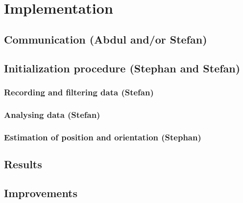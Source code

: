 \section{Implementation}\label{Sec_Imp}

\subsection{Communication (Abdul and/or Stefan)}

\subsection{Initialization procedure (Stephan and Stefan)}

\subsubsection{Recording and filtering data (Stefan)}

\subsubsection{Analysing data (Stefan)}

\subsubsection{Estimation of position and orientation (Stephan)}

\subsection{Results}

\subsection{Improvements}

